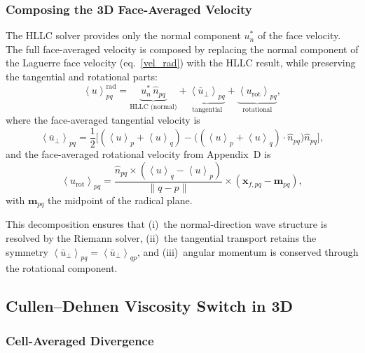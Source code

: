 \documentclass[twocolumn]{aastex63}
\newcommand{\vel}{{u}}
\newcommand{\vect}[1]{\mathbf{#1}}
\begin{document}
\subsubsection{Composing the 3D Face-Averaged Velocity}

The HLLC solver provides only the normal component
$\vel^*_n$ of the face velocity.
The full face-averaged velocity is composed by replacing
the normal component of the Laguerre face velocity
(eq.~\ref{vel_rad}) with the HLLC result,
while preserving the tangential and rotational parts:
\begin{equation}\label{eq:vface3d}
  \boxed{
  \left<\vel\right>_{pq}^\textrm{rad}
  = \underbrace{\vel^*_n\,\hat{n}_{pq}}_
      {\text{HLLC (normal)}}
  + \underbrace{\left<\bar{\vel}_\perp\right>_{pq}}_
      {\text{tangential}}
  + \underbrace{\left<\vel_\textrm{rot}\right>_{pq}}_
      {\text{rotational}},
  }
\end{equation}
where the face-averaged tangential velocity is
\begin{equation}
  \left<\bar{\vel}_\perp\right>_{pq}
  = \frac{1}{2}\bigl[
    (\left<\vel\right>_p + \left<\vel\right>_q)
    - \bigl((\left<\vel\right>_p + \left<\vel\right>_q)
        \cdot\hat{n}_{pq}\bigr)\hat{n}_{pq}\bigr],
\end{equation}
and the face-averaged rotational velocity from Appendix~D is
\begin{equation}
  \left<\vel_\textrm{rot}\right>_{pq}
  = \frac{\hat{n}_{pq}\times
    (\left<\vel\right>_q - \left<\vel\right>_p)}
    {\|q - p\|}
    \times (\vect{x}_{f,pq} - \vect{m}_{pq}),
\end{equation}
with $\vect{m}_{pq}$ the midpoint of the radical plane.

This decomposition ensures that (i)~the normal-direction
wave structure is resolved by the Riemann solver,
(ii)~the tangential transport retains the symmetry
$\left<\bar{\vel}_\perp\right>_{pq}
 = \left<\bar{\vel}_\perp\right>_{qp}$,
and (iii)~angular momentum is conserved through the
rotational component.


\subsection{Cullen--Dehnen Viscosity Switch in 3D}

\subsubsection{Cell-Averaged Divergence}
\end{document}
